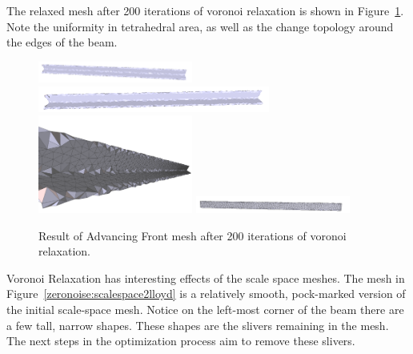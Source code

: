 \documentclass[12pt]{drexelthesis}
\begin{document}
The relaxed mesh after 200 iterations of voronoi relaxation is shown in Figure~\ref{zeronoise:advancedlloyd}. Note the uniformity in tetrahedral area, as well as the change topology around the edges of the beam.

\begin{figure}[!ht]
	\centering
		\includegraphics[width=2in]{simulated-lab-scan/0noise/optimized/advancedfrontlloyd00.png}
		\includegraphics[width=3in]{simulated-lab-scan/0noise/optimized/advancedfrontlloyd01.png}
		\includegraphics[width=2in]{simulated-lab-scan/0noise/optimized/advancedfrontlloyd02.png}
		\includegraphics[width=2in]{simulated-lab-scan/0noise/optimized/advancedfrontlloyd03.png}
		\caption[Advancing Front mesh after 200 iterations of voronoi relaxation]{\centering  Result of Advancing Front mesh after 200 iterations of voronoi relaxation.}
	\label{zeronoise:advancedlloyd}
\end{figure}

Voronoi Relaxation has interesting effects of the scale space meshes. The mesh in Figure~\ref{zeronoise:scalespace2lloyd} is a relatively smooth, pock-marked version of the initial scale-space mesh. Notice on the left-most corner of the beam there are a few tall, narrow shapes. These shapes are the slivers remaining in the mesh. The next steps in the optimization process aim to remove these slivers.
\end{document}
